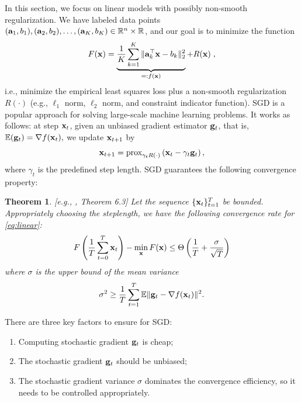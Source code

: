 \documentclass{article}
\newcommand{\R}{\mathbb{R}}
\def\a{{\bf a}}
\def\g{{\bf g}}
\def\x{{\bf x}}
\def\E{\mathbb{E}}
\newtheorem{theorem}{Theorem}
\begin{document}
\vspace{-0.5em}
In this section, we focus on linear models with possibly non-smooth regularization. We have labeled data points $(\a_1, b_1), (\a_2, b_2), \ldots, (\a_K, b_K) \in \R^n \times \R$, and our goal is to minimize the function
\vspace{-0.5em}
\begin{align}
F(\x) = \underbrace{\frac{1}{K} \sum_{k = 1}^K \| \a_k^\top \x - b_k \|_2^2}_{=: f(\x)} + R(\x) \; ,
\label{eq:linear}
\end{align}
i.e., minimize the empirical least squares loss plus a non-smooth regularization $R(\cdot)$ (e.g., $\ell_1$ norm, $\ell_2$ norm, and constraint indicator function). SGD is a popular approach for solving large-scale machine learning problems. It works as follows: at step $\x_t$, given an unbiased gradient estimator $\g_t$, that is, 
$\E(\g_t) = \nabla f(\x_t),$
we update $\x_{t+1}$ by
\[
\x_{t+1} = \text{prox}_{\gamma_t R(\cdot)}\left( \x_t - \gamma_t \g_t\right),
\]
where $\gamma_t$ is the predefined step length. SGD guarantees the following convergence property:
\begin{theorem}\label{thm:sgd-conv}[e.g., \cite{2014arXiv1405.4980B}, Theorem 6.3]
Let the sequence $\{\x_t\}_{t=1}^T$ be bounded. Appropriately choosing the steplength,
we have the following convergence rate for \eqref{eq:linear}:
% 
\begin{equation}
F\left(\frac{1}{T} \sum_{t = 0}^T \x_t\right) - \min_{\x}F(\x) \leq \Theta\left({1\over T} + {\sigma \over \sqrt{T}}\right) 
\label{eq:sgd-conv}
\end{equation}
where $\sigma$ is the upper bound of the mean variance 
\[
\sigma^2 \geq {1\over T}\sum_{t=1}^T \E\|\g_t - \nabla f(\x_t)\|^2. 
\]
\end{theorem} 
\vspace{-2em}
There are three key factors to ensure for SGD:
\begin{enumerate}
\vspace{-0.75em}
\item Computing stochastic gradient $\g_t$ is cheap;
\vspace{-0.75em}
\item The stochastic gradient $\g_t$ should be unbiased;
\vspace{-0.75em}
\item The stochastic gradient variance $\sigma$ dominates the convergence efficiency, so it needs to be controlled appropriately.
\end{enumerate}
\end{document}
